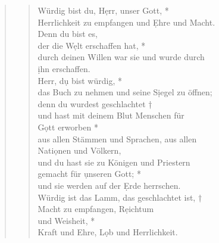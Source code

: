 \newpage

\def\greinitialformat#1{{\fontsize{40}{40}\selectfont #1}}
\gresetfirstlineaboveinitial{\small \textcolor{red}{Ap 4;5}}{}
\setaboveinitialseparation{0.72mm}



\bf


\begin{quote}
\begin{verse}
Würdig bist du, H\d err, unser Gott, *\\ 
Herrlichkeit zu empfangen und \d Ehre und Macht.\\ 
\vin Denn du bist es,\\ 
\vin der die W\d elt erschaffen hat, *\\ 
\vin durch deinen Willen war sie und wurde durch\\ 
\vin \d ihn erschaffen.\\ 
Herr, d\d u bist würdig, *\\ 
das Buch zu nehmen und seine S\d iegel zu öffnen;\\ 
\vin denn du wurdest geschlachtet †\\ 
\vin und hast mit deinem Blut Menschen für \\ 
\vin G\d ott erworben *\\ 
\vin aus allen Stämmen und Sprachen, aus allen\\ 
\vin Nati\d onen und Völkern, \\
und du hast sie zu Königen und Priestern\\ 
gemacht für \d unseren Gott; *\\  
und sie werden auf der \d Erde herrschen.\\ 
\vin Würdig ist das Lamm, das geschlachtet ist, †\\ 
\vin Macht zu empfangen, R\d eichtum \\ 
\vin und Weisheit, *\\ 
\vin  Kraft und Ehre, L\d ob und Herrlichkeit.\\  

\end{verse}
\end{quote}

